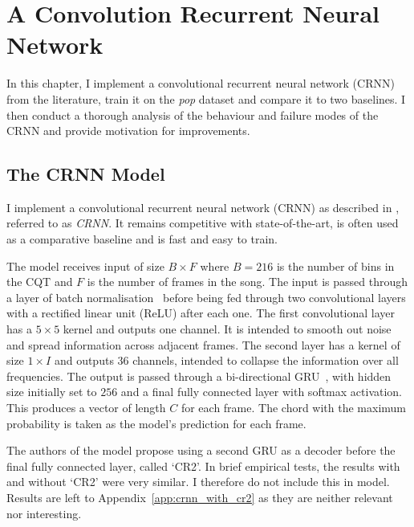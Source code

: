 \chapter{A Convolution Recurrent Neural Network}\label{chap:crnn}

In this chapter, I implement a convolutional recurrent neural network (CRNN) from the literature, train it on the \emph{pop} dataset and compare it to two baselines. I then conduct a thorough analysis of the behaviour and failure modes of the CRNN and provide motivation for improvements. 

\section{The CRNN Model}\label{sec:crnn}

I implement a convolutional recurrent neural network (CRNN) as described in \citet{StructuredTraining}, referred to as \emph{CRNN}. It remains competitive with state-of-the-art, is often used as a comparative baseline and is fast and easy to train.

The model receives input of size $B \times F$ where $B=216$ is the number of bins in the CQT and $F$ is the number of frames in the song. The input is passed through a layer of batch normalisation~\citep{BatchNorm} before being fed through two convolutional layers with a rectified linear unit (ReLU) after each one. The first convolutional layer has a $5\times 5$ kernel and outputs one channel. It is intended to smooth out noise and spread information across adjacent frames. The second layer has a kernel of size $1\times I$ and outputs 36 channels, intended to collapse the information over all frequencies. The output is passed through a bi-directional GRU~\citep{GRU}, with hidden size initially set to $256$ and a final fully connected layer with softmax activation. This produces a vector of length $C$ for each frame. The chord with the maximum probability is taken as the model's prediction for each frame.

The authors of the model propose using a second GRU as a decoder before the final fully connected layer, called `CR2'. In brief empirical tests, the results with and without `CR2' were very similar. I therefore do not include this in model. Results are left to Appendix~\ref{app:crnn_with_cr2} as they are neither relevant nor interesting.


